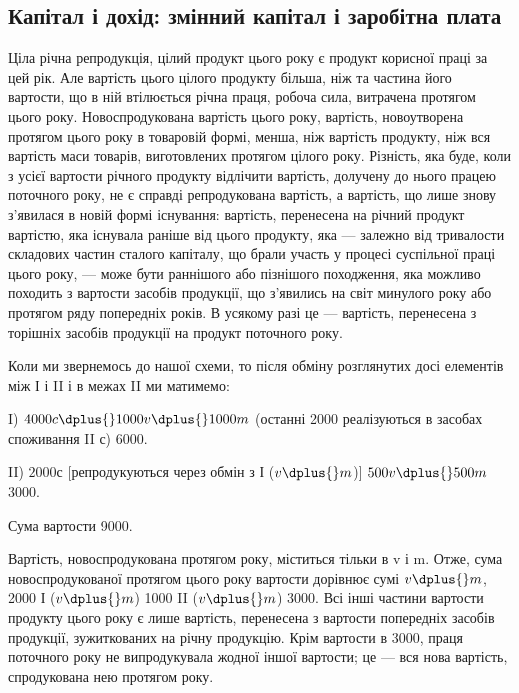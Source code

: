 
\subsection[Капітал і дохід: змінний капітал і заробітна плата]{Капітал і дохід: змінний капітал і заробітна плата\footnotemark{}}


\label{original-338}
\noindent{}Ціла річна репродукція, цілий продукт цього року є продукт корисної
праці за цей рік. Але вартість цього цілого продукту більша, ніж
та частина його вартости, що в ній втілюється річна праця, робоча
сила, витрачена протягом цього року. Новоспродукована вартість
цього року, вартість, новоутворена протягом цього року в товаровій
формі, менша, ніж вартість продукту, ніж вся вартість маси товарів,
виготовлених протягом цілого року. Різність, яка буде, коли з усієї
вартости річного продукту відлічити вартість, долучену до нього працею
поточного року, не є справді репродукована вартість, а вартість, що лише
знову з’явилася в новій формі існування: вартість, перенесена на річний
продукт вартістю, яка існувала раніше від цього продукту, яка — залежно
від тривалости складових частин сталого капіталу, що брали участь у
процесі суспільної праці цього року, — може бути раннішого або пізнішого
походження, яка можливо походить з вартости засобів продукції,
що з’явились на світ минулого року або протягом ряду попередніх років.
В усякому разі це — вартість, перенесена з торішніх засобів продукції
на продукт поточного року.

Коли ми звернемось до нашої схеми, то після обміну розглянутих досі
елементів між І і II і в межах II ми матимемо:

I) $4000 c \dplus{} 1000 v \dplus{} 1000 m$ (останні 2000 реалізуються в засобах
споживання II с) \deq{} 6000.

II) $2000 с$ [репродукуються через обмін з І ($v \dplus{} m$)] \dplus{} $500 v \dplus{} 500 m$ \deq{} 3000.

Сума вартости \deq{} 9000.

Вартість, новоспродукована протягом року, міститься тільки в v і m.
Отже, сума новоспродукованої протягом цього року вартости дорівнює
сумі $v \dplus{} m$, \deq{} 2000 І ($v \dplus{} m$) \dplus{} 1000 II ($v \dplus{} m$) \deq{} 3000. Всі інші частини
вартости продукту цього року є лише вартість, перенесена з вартости
попередніх засобів продукції, зужиткованих на річну продукцію.
Крім вартости в 3000, праця поточного року не випродукувала жодної
іншої вартости; це — вся нова вартість, спродукована нею протягом року.

